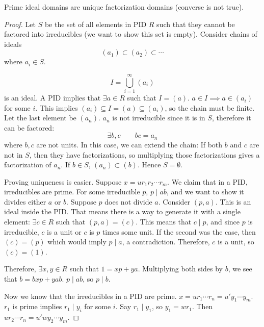 \documentclass[a4paper,twoside,master.tex]{subfiles}
\begin{document}
\begin{claim}
    Prime ideal domains are unique factorization domains (converse is not true).
\end{claim}
\begin{proof}
    Let $ S $ be the set of all elements in PID $ R $ such that they cannot be factored into irreducibles (we want to show this set is empty). Consider chains of ideals
    \begin{equation}
        (a_1) \subset (a_2) \subset \cdots
    \end{equation}
    where $ a_i \in S $.

    \begin{equation}
        I = \bigcup_{i=1}^{\infty} (a_i)
    \end{equation}
    is an ideal. A PID implies that $ \exists a \in R $ such that $ I = (a) $. $ a \in I \implies a \in (a_i) $ for some $ i $. This implies $ (a_i) \subseteq I = (a) \subseteq (a_i) $, so the chain must be finite. Let the last element be $ (a_n) $. $ a_n $ is not irreducible since it is in $ S $, therefore it can be factored:
    \begin{equation}
        \exists b,c\qquad b c = a_n
    \end{equation}
    where $ b, c $ are not units. In this case, we can extend the chain: If both $ b $ and $ c $ are not in $ S $, then they have factorizations, so multiplying those factorizations gives a factorization of $ a_n $. If $ b \in S $, $ (a_n) \subset (b) $. Hence $ S = \emptyset $. 

    Proving uniqueness is easier. Suppose $ x = u r_1 r_2 \cdots r_m $. We claim that in a PID, irreducibles are prime. For some irreducible $ p $, $ p\mid a b $, and we want to show it divides either $ a $ or $ b $. Suppose $ p $ does not divide $ a $. Consider $ (p,a) $. This is an ideal inside the PID. That means there is a way to generate it with a single element: $ \exists c \in R $ such that $ (p,a) = (c) $. This means that $ c\mid p $, and since $ p $ is irreducible, $ c $ is a unit or $ c $ is $ p $ times some unit. If the second was the case, then $ (c) = (p) $ which would imply $ p\mid a $, a contradiction. Therefore, $ c $ is a unit, so $ (c) = (1) $.

    Therefore, $ \exists x,y \in R $ such that $ 1 = x p + y a $. Multiplying both sides by $ b $, we see that $ b = b x p + y a b $. $ p \mid a b $, so $ p\mid b $.

    Now we know that the irreducibles in a PID are prime. $ x = u r_1 \cdots r_n = u' y_1 \cdots y_m $. $ r_1 $ is prime implies $ r_1 \mid y_i $ for some $ i $. Say $ r_1\mid y_1 $, so $ y_1 = w r_1 $. Then $ u r_2 \cdots r_n = u' w y_2 \cdots y_m $.
\end{proof}
\end{document}

